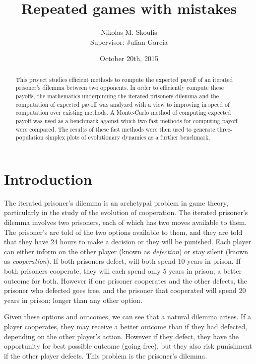\documentclass[a4paper,11pt]{article}
\begin{document}
\title{Repeated games with mistakes}
\author{Nikolas M. Skoufis \\ Supervisor: Julian Garcia}
\date{October 20th, 2015}

\maketitle

\begin{abstract}

This project studies efficient methods to compute the expected payoff of an iterated prisoner's dilemma between two opponents.
In order to efficiently compute these payoffs, the mathematics underpinning the iterated prisoners dilemma and the computation of expected payoff was analyzed with a view to improving in speed of computation over existing methods.
A Monte-Carlo method of computing expected payoff was used as a benchmark against which two fast methods for computing payoff were compared.
The results of these fast methods were then used to generate three-population simplex plots of evolutionary dynamics as a further benchmark.

\end{abstract}

\section*{Introduction}

The iterated prisoner's dilemma is an archetypal problem in game theory, particularly in the study of the evolution of cooperation.
The iterated prisoner's dilemma involves two prisoners, each of which has two moves available to them.
The prisoner's are told of the two options available to them, and they are told that they have 24 hours to make a decision or they will be punished.
Each player can either inform on the other player (known as \textit{defection}) or stay silent (known as \textit{cooperation}).
If both prisoners defect, will both spend 10 years in prison.
If both prisoners cooperate, they will each spend only 5 years in prison; a better outcome for both.
However if one prisoner cooperates and the other defects, the prisoner who defected goes free, and the prisoner that cooperated will spend 20 years in prison; longer than any other option.

Given these options and outcomes, we can see that a natural dilemma arises.
If a player cooperates, they may receive a better outcome than if they had defected, depending on the other player's action.
However if they defect, they have the opportunity for best possible outcome (going free), but they also risk punishment if the other player defects.
This problem is the prisoner's dilemma.
\end{document}
